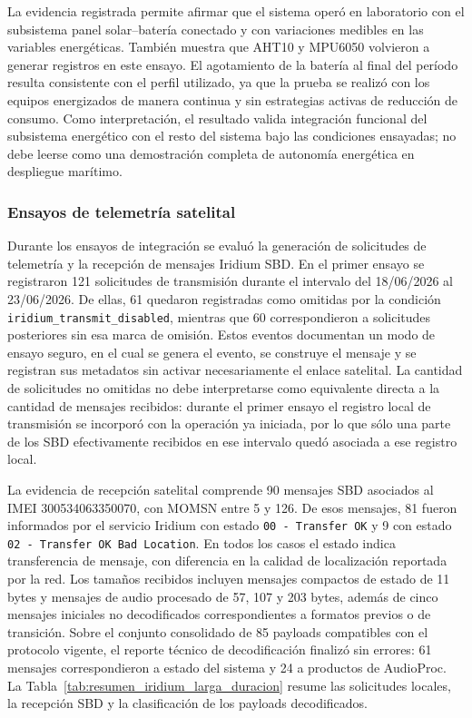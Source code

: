 La evidencia registrada permite afirmar que el sistema operó en laboratorio con el subsistema panel solar--batería conectado y con variaciones medibles en las variables energéticas. También muestra que AHT10 y MPU6050 volvieron a generar registros en este ensayo. El agotamiento de la batería al final del período resulta consistente con el perfil utilizado, ya que la prueba se realizó con los equipos energizados de manera continua y sin estrategias activas de reducción de consumo. Como interpretación, el resultado valida integración funcional del subsistema energético con el resto del sistema bajo las condiciones ensayadas; no debe leerse como una demostración completa de autonomía energética en despliegue marítimo.

\subsubsection{Ensayos de telemetría satelital}

Durante los ensayos de integración se evaluó la generación de solicitudes de telemetría y la recepción de mensajes Iridium SBD. En el primer ensayo se registraron 121 solicitudes de transmisión durante el intervalo del 18/06/2026 al 23/06/2026. De ellas, 61 quedaron registradas como omitidas por la condición \texttt{iridium\_transmit\_disabled}, mientras que 60 correspondieron a solicitudes posteriores sin esa marca de omisión. Estos eventos documentan un modo de ensayo seguro, en el cual se genera el evento, se construye el mensaje y se registran sus metadatos sin activar necesariamente el enlace satelital. La cantidad de solicitudes no omitidas no debe interpretarse como equivalente directa a la cantidad de mensajes recibidos: durante el primer ensayo el registro local de transmisión se incorporó con la operación ya iniciada, por lo que sólo una parte de los SBD efectivamente recibidos en ese intervalo quedó asociada a ese registro local.

La evidencia de recepción satelital comprende 90 mensajes SBD asociados al IMEI 300534063350070, con MOMSN entre 5 y 126. De esos mensajes, 81 fueron informados por el servicio Iridium con estado \texttt{00 - Transfer OK} y 9 con estado \texttt{02 - Transfer OK Bad Location}. En todos los casos el estado indica transferencia de mensaje, con diferencia en la calidad de localización reportada por la red. Los tamaños recibidos incluyen mensajes compactos de estado de 11 bytes y mensajes de audio procesado de 57, 107 y 203 bytes, además de cinco mensajes iniciales no decodificados correspondientes a formatos previos o de transición. Sobre el conjunto consolidado de 85 payloads compatibles con el protocolo vigente, el reporte técnico de decodificación finalizó sin errores: 61 mensajes correspondieron a estado del sistema y 24 a productos de AudioProc. La Tabla~\ref{tab:resumen_iridium_larga_duracion} resume las solicitudes locales, la recepción SBD y la clasificación de los payloads decodificados.

